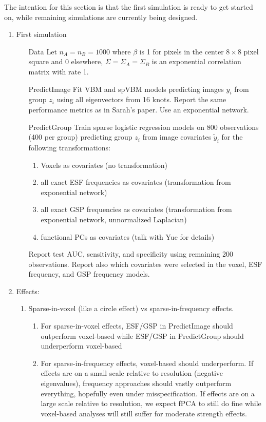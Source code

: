 \documentclass[12pt]{article}
\begin{document}
The intention for this section is that the first simulation is ready to get started on, while remaining simulations are currently being designed.

\begin{enumerate}
	\item First simulation
	      \begin{enumerate}
		      \item[Data] Let $n_A=n_B=1000$ where $\beta$ is 1 for pixels in the center $8\times8$ pixel square and 0 elsewhere, $\Sigma=\Sigma_A=\Sigma_B$ is an exponential correlation matrix with rate 1.
		      \item[PredictImage] Fit VBM and spVBM models predicting images $y_i$ from group $z_i$ using all eigenvectors from 16 knots. Report the same performance metrics as in Sarah's paper. Use an exponential network.
		      \item[PredictGroup] Train sparse logistic regression models on 800 observations (400 per group) predicting group $z_i$ from image covariates $\tilde y_i$ for the following transformations:
		            \begin{enumerate}
			            \item Voxels as covariates (no transformation)
			            \item all exact ESF frequencies as covariates (transformation from exponential network)
			            \item all exact GSP frequencies as covariates (transformation from exponential network, unnormalized Laplacian)
			            \item functional PCs as covariates (talk with Yue for details)
		            \end{enumerate}
		            Report test AUC, sensitivity, and specificity using remaining 200 observations. Report also which covariates were selected in the voxel, ESF frequency, and GSP frequency models.
	      \end{enumerate}
	\item Effects:
	      \begin{enumerate}
		      \item Sparse-in-voxel (like a circle effect) vs sparse-in-frequency effects.
		            \begin{enumerate}
			            \item For sparse-in-voxel effects, ESF/GSP in PredictImage should outperform voxel-based while ESF/GSP in PredictGroup should underperform voxel-based
			            \item For sparse-in-frequency effects, voxel-based should underperform. If effects are on a small scale relative to resolution (negative eigenvalues), frequency approaches should vastly outperform everything, hopefully even under misspecification. If effects are on a large scale relative to resolution, we expect fPCA to still do fine while voxel-based analyses will still suffer for moderate strength effects.

\end{enumerate}
\end{enumerate}
\end{enumerate}
\end{document}
